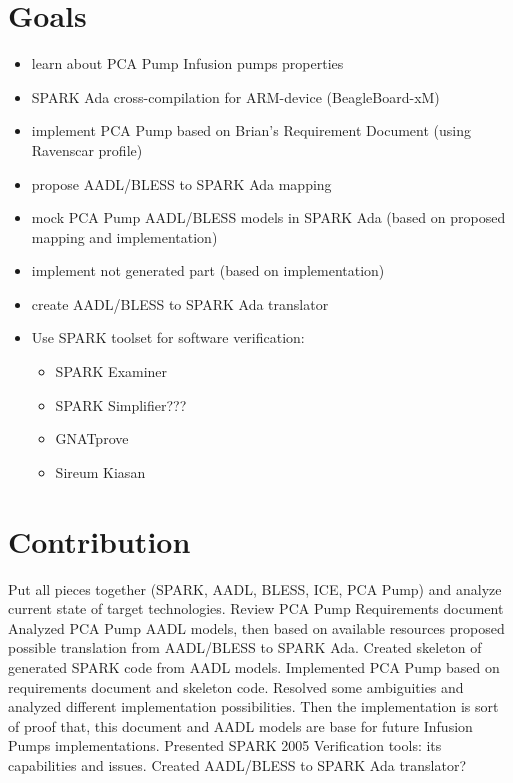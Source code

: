 \section{Goals}
\label{introduction:goals}
\begin{itemize}
	\item learn about PCA Pump Infusion pumps properties
	\item SPARK Ada cross-compilation for ARM-device (BeagleBoard-xM)
	\item implement PCA Pump based on Brian's Requirement Document (using Ravenscar profile)
	\item propose AADL/BLESS to SPARK Ada mapping
	\item mock PCA Pump AADL/BLESS models in SPARK Ada (based on proposed mapping and implementation)
	\item implement not generated part (based on implementation)
	\item create AADL/BLESS to SPARK Ada translator
	\item Use SPARK toolset for software verification:
		\begin{itemize}
			\item SPARK Examiner
			\item SPARK Simplifier??? %
			\item GNATprove
			\item Sireum Kiasan
		\end{itemize}
\end{itemize}




\section{Contribution}
\label{introduction:contribution}
Put all pieces together (SPARK, AADL, BLESS, ICE, PCA Pump) and analyze current state of target technologies.
Review PCA Pump Requirements document
Analyzed PCA Pump AADL models, then based on available resources proposed possible translation from AADL/BLESS to SPARK Ada.
Created skeleton of generated SPARK code from AADL models.
Implemented PCA Pump based on requirements document and skeleton code. Resolved some ambiguities and analyzed different implementation possibilities. Then the implementation is sort of proof that, this document and AADL models are base for future Infusion Pumps implementations.
Presented SPARK 2005 Verification tools: its capabilities and issues.
Created AADL/BLESS to SPARK Ada translator?



